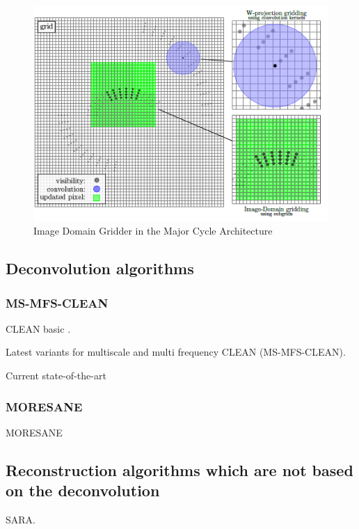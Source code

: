 \begin{figure}[h]
	\centering
	\includegraphics[width=0.40\linewidth]{./chapters/03.distribution/idg/idg0.png}
	\caption{Image Domain Gridder in the Major Cycle Architecture}
	\label{distribution:idg:idg0}
\end{figure}


\subsection{Deconvolution algorithms}
\subsubsection{MS-MFS-CLEAN}
CLEAN basic \cite{hogbom1974aperture}.

Latest variants for multiscale and multi frequency CLEAN (MS-MFS-CLEAN)\cite{rau2011multi}.

Current state-of-the-art

\subsubsection{MORESANE}
MORESANE \cite{dabbech2015moresane}


\subsection{Reconstruction algorithms which are not based on the deconvolution}
SARA\cite{dabbech2018cygnus}.










